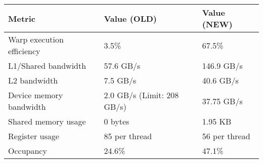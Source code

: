 \begin{center}\vspace{1cm}
\begin{tabular}{l l l}
\toprule
    \bf{Metric}					& \bf{Value (OLD)} & \bf{Value (NEW)}\\
 \midrule
    Warp execution efficiency 	& 3.5\%  & 67.5\%\\
    L1/Shared bandwidth 		& 57.6 GB/s & 146.9 GB/s  \\
    L2 bandwidth				& 7.5 GB/s & 40.6 GB/s\\
    Device memory bandwidth		& 2.0 GB/s (Limit: 208 GB/s) & 37.75 GB/s\\
    Shared memory usage			& 0 bytes & 1.95 KB\\
    Register usage				& 85 per thread & 56 per thread\\
    Occupancy					& 24.6\% & 47.1\%\\
\bottomrule
\end{tabular}
\end{center}\vspace{1cm}

